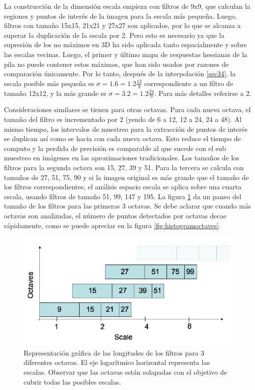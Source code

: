 La construcción de la dimensión escala empieza con filtros de 9x9, que calculan la regiones y puntos de interés de la imagen para la escala más pequeña. Luego, filtros con tamaño 15x15, 21x21 y 27x27 son aplicados, por lo que se alcanza a superar la duplicación de la escala por 2. Pero esto es necesario ya que la supresión de los no máximos en 3D ha sido aplicada tanto espacialmente y sobre las escalas vecinas. Luego, el primer y último mapa de respuestas hessianas de la pila no puede contener estos máximos, que han sido usados por razones de comparación únicamente. Por lo tanto, después de la interpolación \ref{sec34}, la escala posible más pequeña es $\sigma=1.6=1.2\frac{12}{9}$ correspondiente a un filtro de tamaño 12x12, y la más grande es $\sigma=3.2=1.2\frac{24}{9}$.
Para más detalles referirse a 2.

Consideraciones similares se tienen para otras octavas. Para cada nueva octava, el tamaño del filtro es incrementado por 2 (yendo de 6 a 12, 12 a 24, 24 a 48). Al mismo tiempo, los intervalos de muestreo para la extracción de puntos de interés se duplican así como se hacia con cada nueva octava. Esto reduce el tiempo de computo y la perdida de precisión es comparable al que sucede con el sub muestreo en imágenes en las aproximaciones tradicionales. Los tamaños de los filtros para la segunda octava son 15, 27, 39 y 51. Para la tercera se calcula con tamaños de 27, 51, 75, 90 y si la imagen original es más grande que el tamaño de  los filtros correspondientes, el análisis espacio escala se aplica sobre una cuarta escala, usando filtros de tamaño 51, 99, 147 y 195. La figura \ref{fig:tamfilters} da un paneo del tamaño de los filtros para las primeras 3 octavas. Se debe aclarar que cuando más octavas son analizadas, el número de puntos detectados por octavas decae rápidamente, como se puede apreciar en la figura \ref{fig:histogramoctaves}.
\begin{figure}[tbhp]
   \centering
        \includegraphics[scale=0.4]{./figs/tamfilters}
    \caption[Representación gráfica de las longitudes de los filtros para 3 diferentes octavas]{Representación gráfica de las longitudes de los filtros para 3 diferentes octavas. El eje logarítmico horizontal representa las escalas. Observar que las octavas están solapadas con el objetivo de cubrir todas las posibles escalas.}
   \label{fig:tamfilters}               %
\end{figure}

